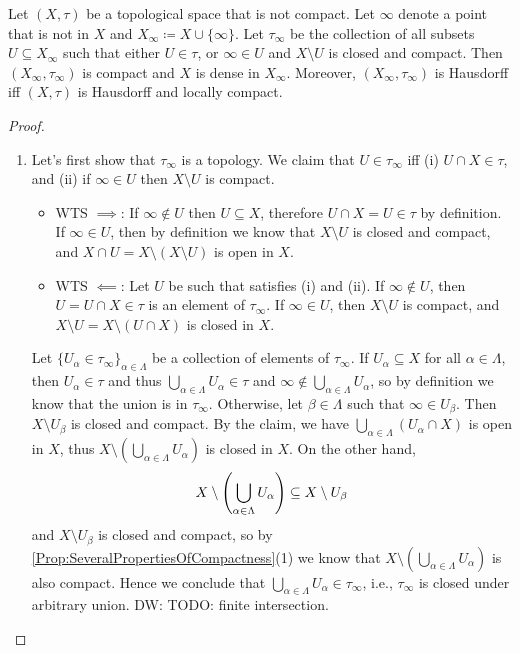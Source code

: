 \documentclass[screen]{techreport}
\numberwithin{equation}{section}
\newcommand{\diw}[1]{{\color{Red} DW: #1}}
\begin{document}
\begin{theorem}\label{The:AlexandroffCompactification}
	Let $(X,\tau)$ be a topological space that is not compact.
	Let $\infty$ denote a point that is not in $X$ and $X_\infty \coloneqq X \cup \{\infty\}$.
	Let $\tau_\infty$ be the collection of all subsets $U \subseteq X_\infty$ such that either $U \in \tau$, or $\infty \in U$ and $X \setminus U$ is closed and compact.
	Then $(X_\infty,\tau_\infty)$ is compact and $X$ is dense in $X_\infty$.
	Moreover, $(X_\infty,\tau_\infty)$ is Hausdorff iff $(X,\tau)$ is Hausdorff and locally compact.
\end{theorem}
\begin{proof}\
	\begin{enumerate}
		\item Let's first show that $\tau_\infty$ is a topology.
		We claim that $U \in \tau_\infty$ iff (i) $U \cap X \in \tau$, and (ii) if $\infty \in U$ then $X \setminus U$ is compact.
		\begin{itemize}
			\item WTS ${\implies}$: If $\infty \not\in U$ then $U \subseteq X$, therefore $U \cap X = U \in \tau$ by definition.
			If $\infty \in U$, then by definition we know that $X \setminus U$ is closed and compact, and $X \cap U = X \setminus (X \setminus U)$ is open in $X$.
			\item WTS $\impliedby$: Let $U$ be such that satisfies (i) and (ii).
			If $\infty \not\in U$, then $U = U \cap X \in \tau$ is an element of $\tau_\infty$.
			If $\infty \in U$, then $X \setminus U$ is compact, and $X \setminus U = X \setminus (U \cap X)$ is closed in $X$.
		\end{itemize}
		Let $\{ U_\alpha \in \tau_\infty\}_{\alpha \in \Lambda}$ be a collection of elements of $\tau_\infty$.
		If $U_\alpha \subseteq X$ for all $\alpha \in \Lambda$, then $U_\alpha \in \tau$ and thus $\bigcup_{\alpha \in \Lambda} U_\alpha \in \tau$ and $\infty \not\in \bigcup_{\alpha \in \Lambda} U_\alpha$, so by definition we know that the union is in $\tau_\infty$.
		Otherwise, let $\beta \in \Lambda$ such that $\infty \in U_\beta$.
		Then $X \setminus U_\beta$ is closed and compact.
		By the claim, we have $\bigcup_{\alpha \in \Lambda} (U_\alpha \cap X)$ is open in $X$, thus $X \setminus (\bigcup_{\alpha \in \Lambda} U_\alpha)$ is closed in $X$.
		On the other hand,
		\[
		X \setminus \left({\bigcup_{\alpha \in \Lambda} U_\alpha}\right) \subseteq X \setminus U_\beta
		\]
		and $X \setminus U_\beta$ is closed and compact, so by \cref{Prop:SeveralPropertiesOfCompactness}(1) we know that $X \setminus (\bigcup_{\alpha \in \Lambda} U_\alpha)$ is also compact.
		Hence we conclude that $\bigcup_{\alpha \in \Lambda} U_\alpha \in \tau_\infty$, i.e., $\tau_\infty$ is closed under arbitrary union.
		\diw{TODO: finite intersection.}
		

\end{enumerate}
\end{proof}
\end{document}
